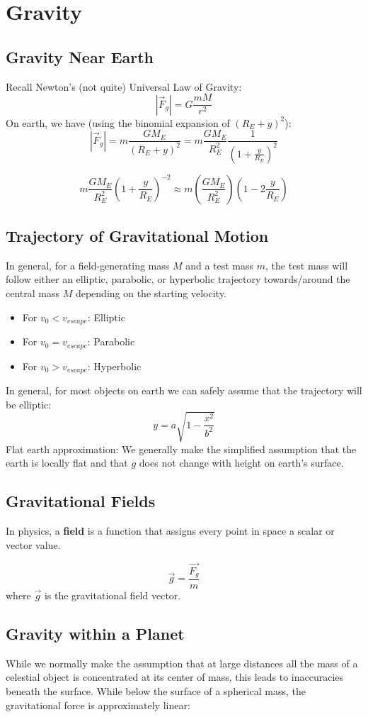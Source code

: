 \documentclass{article}
\begin{document}
\pagebreak
\section{Gravity}
\subsection{Gravity Near Earth}
Recall Newton's (not quite) Universal Law of Gravity:
$$|\vec{F}_{g}|=G\frac{mM}{r^2}$$
On earth, we have (using the binomial expansion of $(R_E+y)^2$):
$$|\vec{F}_{g}|=m\frac{GM_E}{(R_{E}+y)^2}=m\frac{GM_E}{R^2_E}\frac{1}{(1+\frac{y}{R_E})^2}$$

$$m\frac{GM_E}{R^2_E}\left(1+\frac{y}{R_E}\right)^{-2}\approx m\left(\frac{GM_E}{R^2_E}\right)\left(1-2\frac{y}{R_E}\right)$$
\subsection{Trajectory of Gravitational Motion}
In general, for a field-generating mass $M$ and a test mass $m$, the test mass will follow either an elliptic, parabolic, or hyperbolic trajectory towards/around the central mass $M$ depending on the starting velocity.

\begin{itemize}
    \item For $v_0<v_{escape}$: Elliptic 
    \item For $v_0=v_{escape}$: Parabolic
    \item For $v_0>v_{escape}$: Hyperbolic
\end{itemize}
In general, for most objects on earth we can safely assume that the trajectory will be elliptic:
$$y=a\sqrt{1-\frac{x^2}{b^2}}$$
Flat earth approximation: We generally make the simplified assumption that the earth is locally flat and that $g$ does not change with height on earth's surface.
\subsection{Gravitational Fields}
In physics, a \textbf{field} is a function that assigns every point in space a scalar or vector value.

$$\vec{g}=\frac{\vec{F_g}}{m}$$
where $\vec{g}$ is the gravitational field vector.

\subsection{Gravity within a Planet} While we normally make the assumption that at large distances all the mass of a celestial object is concentrated at its center of mass, this leads to inaccuracies beneath the surface. While below the surface of a spherical mass, the gravitational force is approximately linear:
\end{document}

